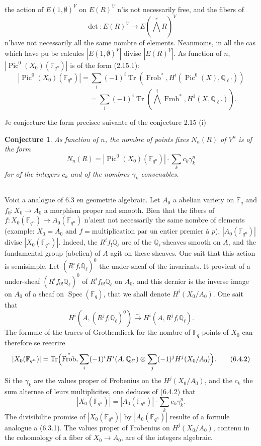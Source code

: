 \documentclass[11pt,a4paper]{article}
\theoremstyle{plain}
\newtheorem{conjecture}[theorem]{Conjecture}
\theoremstyle{definition}
\DeclareMathOperator{\Spec}{Spec}
\DeclareMathOperator{\Pic}{Pic}
\DeclareMathOperator{\Frob}{Frob}
\DeclareMathOperator{\Tr}{Tr}
\newcommand{\Q}{\mathbb{Q}}
\newcommand{\F}{\mathbb{F}}
\begin{document}
the action of $E(1, \emptyset)^V$ on $E(R)^V$ n'is not necessarily free, and the fibers of
\[
\det: E(R)^V \longrightarrow E(\textstyle\bigwedge^r R)^V
\]
n'have not necessarily all the same nombre of elements. Neanmoins, in all the cas which have pu be calcules $|E(1, \emptyset)^V|$ divise $|E(R)^V|$. As function of $n$, $|\Pic^0(X_0)(\F_{q^n})|$ is of the form (2.15.1):
\[
|\Pic^0(X_0)(\F_{q^n})| = \sum_i (-1)^i \Tr(\Frob^*, H^i(\Pic^0(X), \Q_{\ell'}))
\]
\[
\phantom{|\Pic^0(X_0)(\F_{q^n})|} = \sum_i (-1)^i \Tr(\textstyle\bigwedge^i \Frob^*, H^1(X, \Q_{\ell'})).
\]

Je conjecture the form precisee suivante of the conjecture 2.15 (i)

\begin{conjecture}
As function of $n$, the nombre of points fixes $N_n(R)$ of $V^n$ is of the form
\begin{equation}
N_n(R) = |\Pic^0(X_0)(\F_{q^n})| \cdot \sum_k c_k \gamma_k^n
\tag{6.3.1}
\end{equation}
for of the integers $c_k$ and of the nombres $\gamma_k$ convenables.
\end{conjecture}

\subsection{}
Voici a analogue of 6.3 en geometrie algebraic. Let $A_0$ a abelian variety on $\F_q$ and $f_0: X_0 \to A_0$ a morphism proper and smooth. Bien that the fibers of $f: X_0(\F_{q^n}) \to A_0(\F_{q^n})$ n'aient not necessarily the same nombre of elements (example: $X_0 = A_0$ and $f = \text{multiplication par un entier premier \`a } p$), $|A_0(\F_{q^n})|$ divise $|X_0(\F_{q^n})|$. Indeed, the $R^i f_! \Q_\ell$ are of the $\Q_\ell$-sheaves smooth on $A$, and the fundamental group (abelien) of $A$ agit on these sheaves. One sait that this action is semisimple. Let $(R^i f_! \Q_\ell)^0$ the under-sheaf of the invariants. It provient of a under-sheaf $(R^i f_{0!} \Q_\ell)^0$ of $R^i f_{0!} \Q_\ell$ on $A_0$, and this dernier is the inverse image on $A_0$ of a sheaf on $\Spec(\F_q)$, that we shall denote $H^i(X_0/A_0)$. One sait that
\begin{equation}
H^i(A, (R^j f_! \Q_\ell)^0) \xrightarrow{\sim} H^i(A, R^j f_! \Q_\ell).
\tag{6.4.1}
\end{equation}
The formule of the traces of Grothendieck for the nombre of $\F_q$-points of $X_0$ can therefore se reecrire
\begin{equation}
|X_0(\F_{q^n})| = \Tr\Bigl(\Frob^*, \sum_i (-1)^i H^i(A, \Q_{\ell'}) \otimes \sum_j (-1)^j H^j(X_0/A_0)\Bigr).
\tag{6.4.2}
\end{equation}
Si the $\gamma_k$ are the values proper of Frobenius on the $H^j(X_0/A_0)$, and the $c_k$ the sum alternee of leurs multiplicites, one deduces of (6.4.2) that
\begin{equation}
|X_0(\F_{q^n})| = |A_0(\F_{q^n})| \cdot \sum_k c_k \gamma_k^n.
\tag{6.4.3}
\end{equation}
The divisibilite promise of $|X_0(\F_{q^n})|$ by $|A_0(\F_{q^n})|$ resulte of a formule analogue a (6.3.1). The values proper of Frobenius on $H^j(X_0/A_0)$, contenu in the cohomology of a fiber of $X_0 \to A_0$, are of the integers algebraic.
\end{document}
